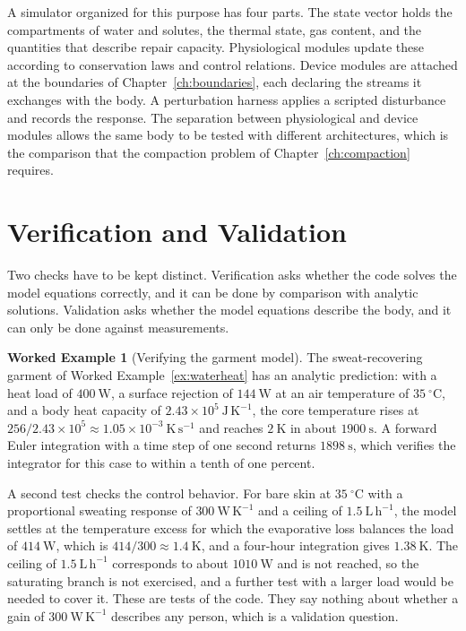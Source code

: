 \documentclass[11pt,openany]{book}
\theoremstyle{definition}
\newtheorem{example}{Worked Example}[chapter]
\theoremstyle{remark}
\begin{document}
A simulator organized for this purpose has four parts. The state vector holds the compartments of water and solutes, the thermal state, gas content, and the quantities that describe repair capacity. Physiological modules update these according to conservation laws and control relations. Device modules are attached at the boundaries of Chapter~\ref{ch:boundaries}, each declaring the streams it exchanges with the body. A perturbation harness applies a scripted disturbance and records the response. The separation between physiological and device modules allows the same body to be tested with different architectures, which is the comparison that the compaction problem of Chapter~\ref{ch:compaction} requires.

\section{Verification and Validation}

Two checks have to be kept distinct. Verification asks whether the code solves the model equations correctly, and it can be done by comparison with analytic solutions. Validation asks whether the model equations describe the body, and it can only be done against measurements.

\begin{example}[Verifying the garment model]
\label{ex:verify}
The sweat-recovering garment of Worked Example~\ref{ex:waterheat} has an analytic prediction: with a heat load of $400\ \mathrm{W}$, a surface rejection of $144\ \mathrm{W}$ at an air temperature of $35\ ^\circ\mathrm{C}$, and a body heat capacity of $2.43\times10^{5}\ \mathrm{J\,K^{-1}}$, the core temperature rises at $256/2.43\times10^{5}\approx1.05\times10^{-3}\ \mathrm{K\,s^{-1}}$ and reaches $2\ \mathrm{K}$ in about $1900\ \mathrm{s}$. A forward Euler integration with a time step of one second returns $1898\ \mathrm{s}$, which verifies the integrator for this case to within a tenth of one percent.

A second test checks the control behavior. For bare skin at $35\ ^\circ\mathrm{C}$ with a proportional sweating response of $300\ \mathrm{W\,K^{-1}}$ and a ceiling of $1.5\ \mathrm{L\,h^{-1}}$, the model settles at the temperature excess for which the evaporative loss balances the load of $414\ \mathrm{W}$, which is $414/300\approx1.4\ \mathrm{K}$, and a four-hour integration gives $1.38\ \mathrm{K}$. The ceiling of $1.5\ \mathrm{L\,h^{-1}}$ corresponds to about $1010\ \mathrm{W}$ and is not reached, so the saturating branch is not exercised, and a further test with a larger load would be needed to cover it. These are tests of the code. They say nothing about whether a gain of $300\ \mathrm{W\,K^{-1}}$ describes any person, which is a validation question.
\end{example}
\end{document}
